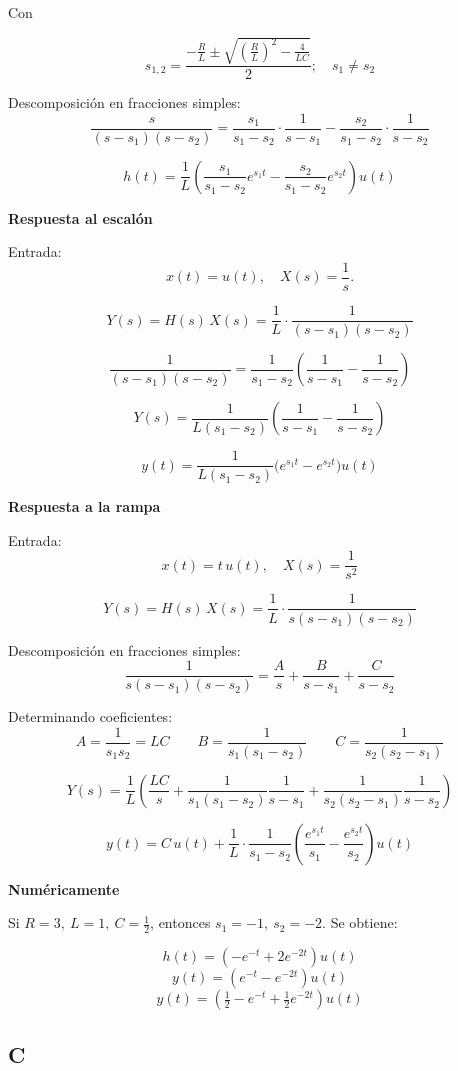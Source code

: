 Con

\[
s_{1,2} = \frac{-\tfrac{R}{L}\pm \sqrt{\left(\tfrac{R}{L}\right)^2-\tfrac{4}{LC}}}{2} ; 
\quad s_1 \neq s_2
\]

Descomposición en fracciones simples:
\[
\frac{s}{(s-s_1)(s-s_2)}
=\frac{s_1}{s_1-s_2}\cdot\frac{1}{s-s_1}
-\frac{s_2}{s_1-s_2}\cdot\frac{1}{s-s_2}
\]

\[
h(t)=\frac{1}{L}\left(\frac{s_1}{s_1-s_2}e^{s_1 t}
-\frac{s_2}{s_1-s_2}e^{s_2 t}\right)u(t)
\]

\textbf{Respuesta al escalón}

Entrada:
\[
x(t)=u(t), \quad X(s)=\frac{1}{s}.
\]

\[
Y(s) = H(s)\,X(s) = \frac{1}{L}\cdot\frac{1}{(s-s_1)(s-s_2)}
\]

\[
\frac{1}{(s-s_1)(s-s_2)} = \frac{1}{s_1-s_2}\left(\frac{1}{s-s_1}-\frac{1}{s-s_2}\right)
\]

\[
Y(s) = \frac{1}{L(s_1-s_2)}\left(\frac{1}{s-s_1}-\frac{1}{s-s_2}\right)
\]

\[
y(t) = \frac{1}{L(s_1-s_2)}\Big(e^{s_1 t}-e^{s_2 t}\Big)u(t)
\]

\textbf{Respuesta a la rampa}

Entrada:
\[
x(t)=t\,u(t), \quad X(s)=\frac{1}{s^2}
\]

\[
Y(s)=H(s)\,X(s)=\frac{1}{L}\cdot\frac{1}{s(s-s_1)(s-s_2)}
\]

Descomposición en fracciones simples:
\[
\frac{1}{s(s-s_1)(s-s_2)}=\frac{A}{s}+\frac{B}{s-s_1}+\frac{C}{s-s_2}
\]

Determinando coeficientes:
\[
A=\frac{1}{s_1 s_2}=LC \qquad
B=\frac{1}{s_1(s_1-s_2)} \qquad
C=\frac{1}{s_2(s_2-s_1)}
\]

\[
Y(s)=\frac{1}{L}\left(\frac{LC}{s}+\frac{1}{s_1(s_1-s_2)}\frac{1}{s-s_1}+\frac{1}{s_2(s_2-s_1)}\frac{1}{s-s_2}\right)
\]

\[
y(t)=C\,u(t)+\frac{1}{L}\cdot\frac{1}{s_1-s_2}\left(\frac{e^{s_1 t}}{s_1}-\frac{e^{s_2 t}}{s_2}\right)u(t)
\]

\textbf{Numéricamente}

Si \(R=3,\ L=1,\ C=\tfrac{1}{2}\), entonces \(s_1=-1,\ s_2=-2\). Se obtiene:

\[
h(t)=(-e^{-t}+2e^{-2t})u(t)
\]
\[
y(t)=(e^{-t}-e^{-2t})u(t)
\]
\[
y(t)=\left(\tfrac{1}{2}-e^{-t}+\tfrac{1}{2}e^{-2t}\right)u(t)
\]

\subsection{C}

